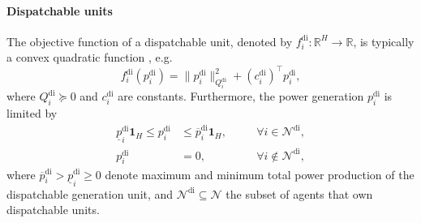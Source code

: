\documentclass{IEEEtran}  %
\newcommand{\0}{\mathbf{0}}
\newcommand{\1}{\mathbf{1}}
\begin{document}
\paragraph*{Dispatchable units}
The objective function of a dispatchable unit, denoted by $f_{i}^{\mathrm{di}}: \mathbb{R}^{H} \to \mathbb{R}$, is typically a convex quadratic function   \cite{atzeni2013,hans2018,sorin2019}, e.g. 
\begin{equation}
f_{i}^{\mathrm{di}}(p_{i}^{\mathrm{di}}) = \|p_{i}^{\mathrm{di}}\|_{Q_i^{\mathrm{di}}}^2+ {(c_i^\mathrm{di})}^\top p_{i}^{\mathrm{di}}, \label{eq:f_dg}
\end{equation}
where $Q_i^{\mathrm{di}}\succcurlyeq0$ and $c_i^{\mathrm{di}}$ are constants.
Furthermore, the power generation $p_{i}^{\mathrm{di}}$ is limited by 
\begin{equation}
\begin{aligned}
\underline{p}_{i}^{\mathrm{di}}\1_{H} \leq p_{i}^{\mathrm{di}} &\leq \overline{p}_{i}^{\mathrm{di}}\1_{H}, \quad& &\forall i\in\mathcal{N}^{\mathrm{di}},\\
p_{i}^{\mathrm{di}} &= 0, \quad& &\forall i\notin\mathcal{N}^{\mathrm{di}},
\end{aligned}
\label{eq:p_dg_bound}	
\end{equation}
where $\overline{p}_{i}^{\mathrm{di}} > \underline{p}_{i}^{\mathrm{di}}\ge 0$ denote maximum and minimum total power production of the dispatchable generation unit, and $\mathcal{N}^{\mathrm{di}}\subseteq\mathcal{N}$ the subset of agents that own dispatchable units.

\smallskip
\end{document}
